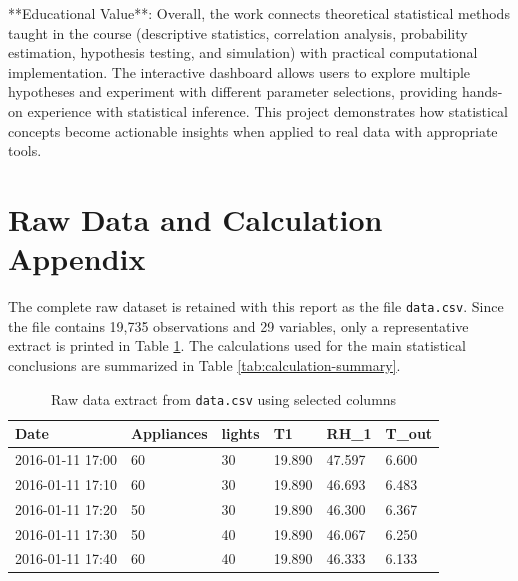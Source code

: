 \documentclass[12pt,a4paper]{article}
\begin{document}
**Educational Value**:
Overall, the work connects theoretical statistical methods taught in the course (descriptive statistics, correlation analysis, probability estimation, hypothesis testing, and simulation) with practical computational implementation. The interactive dashboard allows users to explore multiple hypotheses and experiment with different parameter selections, providing hands-on experience with statistical inference. This project demonstrates how statistical concepts become actionable insights when applied to real data with appropriate tools.

\newpage
\appendix

\section{Raw Data and Calculation Appendix}
\label{sec:appendix}

The complete raw dataset is retained with this report as the file \texttt{data.csv}. Since the file contains 19,735 observations and 29 variables, only a representative extract is printed in Table \ref{tab:raw-data-extract}. The calculations used for the main statistical conclusions are summarized in Table \ref{tab:calculation-summary}.

\begin{longtable}{|p{3.4cm}|p{1.6cm}|p{1.4cm}|p{1.5cm}|p{1.7cm}|p{1.6cm}|}
\caption{Raw data extract from \texttt{data.csv} using selected columns}
\label{tab:raw-data-extract}\\
\hline
\textbf{Date} & \textbf{Appliances} & \textbf{lights} & \textbf{T1} & \textbf{RH\_1} & \textbf{T\_out} \\
\hline
2016-01-11 17:00 & 60 & 30 & 19.890 & 47.597 & 6.600 \\
\hline
2016-01-11 17:10 & 60 & 30 & 19.890 & 46.693 & 6.483 \\
\hline
2016-01-11 17:20 & 50 & 30 & 19.890 & 46.300 & 6.367 \\
\hline
2016-01-11 17:30 & 50 & 40 & 19.890 & 46.067 & 6.250 \\
\hline
2016-01-11 17:40 & 60 & 40 & 19.890 & 46.333 & 6.133 \\
\hline
\end{longtable}
\end{document}
